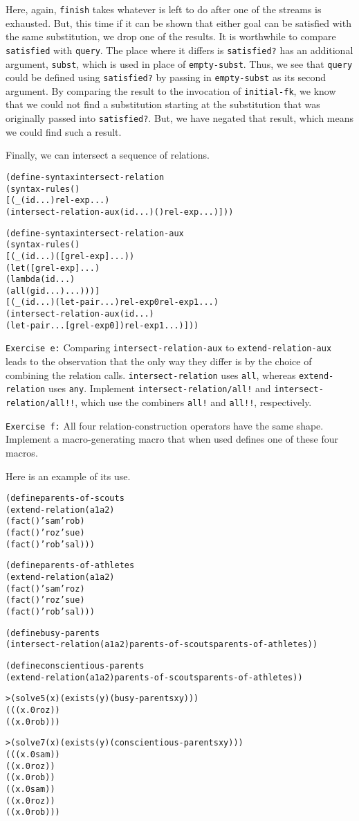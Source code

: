 Here, again, \texttt{finish} takes whatever is left to do after one of
the streams is exhausted.  But, this time if it can be shown that
either goal can be satisfied with the same substitution, we drop
one of the results.  It is worthwhile to compare \texttt{satisfied}
with \texttt{query}.  The place where it differs is
\texttt{satisfied?} has an additional argument, \texttt{subst}, which
is used in place of \texttt{empty-subst}.  Thus, we see that
\texttt{query} could be defined using \texttt{satisfied?} by passing
in \texttt{empty-subst} as its second argument.  By comparing the
result to the invocation of \texttt{initial-fk}, we know that we could not
find a substitution starting at the substitution that was originally
passed into \texttt{satisfied?}.  But, we have negated that result,
which means we could find such a result.

Finally, we can intersect a sequence of relations.
\begin{alltt}
(define-syntax intersect-relation
  (syntax-rules ()
    [(_ (id ...) rel-exp ...)
     (intersect-relation-aux (id ...) () rel-exp ...)]))

(define-syntax intersect-relation-aux
  (syntax-rules ()
    [(_ (id ...) ([g rel-exp] ...))
     (let ([g rel-exp] ...)
       (lambda (id ...)
         (all (g id ...) ...)))]
    [(_ (id ...) (let-pair ...) rel-exp0 rel-exp1 ...)
     (intersect-relation-aux (id ...)
       (let-pair ... [g rel-exp0]) rel-exp1 ...)]))
\end{alltt}

\texttt{Exercise e:} Comparing \texttt{intersect-relation-aux} to
\texttt{extend-relation-aux} leads to the observation that the only
way they differ is by the choice of combining the relation calls.
\texttt{intersect-relation} uses \texttt{all}, whereas
\texttt{extend-relation} uses \texttt{any}.  Implement
\texttt{intersect-relation/all!} and
\texttt{intersect-relation/all!!}, which use the combiners
\texttt{all!} and \texttt{all!!}, respectively.\endofexercise{}

\texttt{Exercise f:} All four relation-construction operators have the
same shape.  Implement a macro-generating macro that when used defines
one of these four macros.

Here is an example of its use.

\begin{alltt}
(define parents-of-scouts
  (extend-relation (a1 a2)
    (fact () 'sam 'rob)
    (fact () 'roz 'sue)
    (fact () 'rob 'sal)))

(define parents-of-athletes
  (extend-relation (a1 a2)
    (fact () 'sam 'roz)
    (fact () 'roz 'sue)
    (fact () 'rob 'sal)))

(define busy-parents
  (intersect-relation (a1 a2) parents-of-scouts parents-of-athletes))

(define conscientious-parents
  (extend-relation (a1 a2) parents-of-scouts parents-of-athletes))

> (solve 5 (x) (exists (y) (busy-parents x y)))
(((x.0 roz))
 ((x.0 rob)))

> (solve 7 (x) (exists (y) (conscientious-parents x y)))
(((x.0 sam))
 ((x.0 roz))
 ((x.0 rob))
 ((x.0 sam))
 ((x.0 roz))
 ((x.0 rob)))
\end{alltt}

